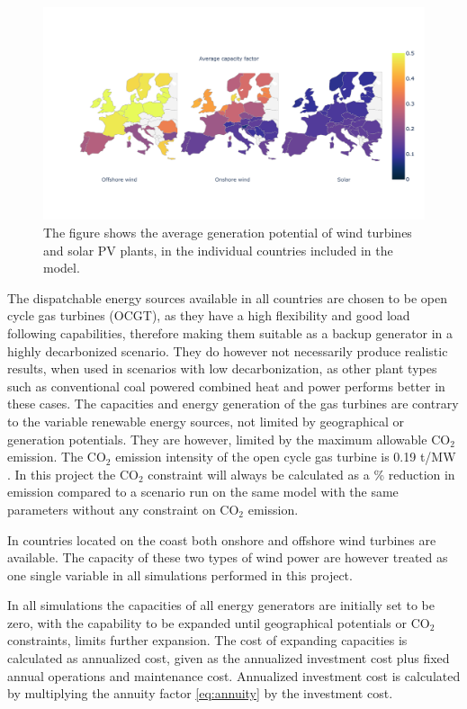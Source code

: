 \begin{figure}[h]\centerfloat
	\includegraphics[width=1.3\textwidth]{./Images/wind_availability}
	\caption{The figure shows the average generation potential of wind turbines and solar PV plants, in the individual countries included in the model.  }
	\label{fig:capacity_factor}
\end{figure}



The dispatchable energy sources available in all countries are chosen to be open cycle gas turbines (OCGT), as they have a high flexibility and good load following capabilities, therefore making them suitable as a backup generator in a highly decarbonized scenario. They do however not necessarily produce realistic results, when used in scenarios with low decarbonization, as other plant types such as conventional coal powered combined heat and power performs better in these cases. The capacities and energy generation of the gas turbines are contrary to the variable renewable energy sources, not limited by geographical or generation potentials. They are however, limited by the maximum allowable $\text{CO}_2$ emission. The $\text{CO}_2$ emission intensity of the open cycle gas turbine is 0.19 t/MW \cite{PyPSA_euro_30_model}. In this project the $\text{CO}_2$ constraint will always be calculated as a \% reduction in emission compared to a scenario run on the same model with the same parameters without any constraint on $\text{CO}_2$ emission. 

In countries located on the coast both onshore and offshore wind turbines are available. The capacity of these two types of wind power are however treated as one single variable in all simulations performed in this project. 

In all simulations the capacities of all energy generators are initially set to be zero, with the capability to be expanded until geographical potentials or $\text{CO}_2$ constraints, limits further expansion. The cost of expanding capacities is calculated as annualized cost, given as the annualized investment cost plus fixed annual operations and maintenance cost. Annualized investment cost is calculated by multiplying the annuity factor \ref{eq:annuity} by the investment cost. 

